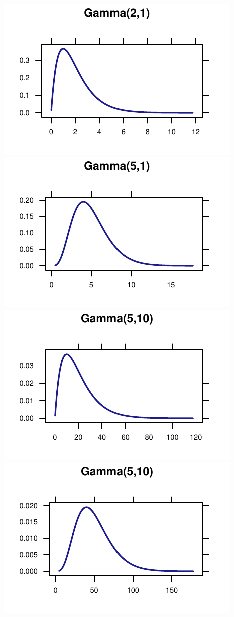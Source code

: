 \documentclass[twoside]{book}\usepackage[]{graphicx}\usepackage[]{xcolor}
\makeatletter
\def\maxwidth{ %
  \ifdim\Gin@nat@width>\linewidth
    \linewidth
  \else
    \Gin@nat@width
  \fi
}
\newenvironment{knitrout}{}{} %
\makeatother
\begin{document}
\begin{knitrout}
{\centering \includegraphics[width=\maxwidth]{figures/fig-unnamed-chunk-79-1} 
\includegraphics[width=\maxwidth]{figures/fig-unnamed-chunk-79-2} 
\includegraphics[width=\maxwidth]{figures/fig-unnamed-chunk-79-3} 
\includegraphics[width=\maxwidth]{figures/fig-unnamed-chunk-79-4} 

}
\end{knitrout}
\end{document}

